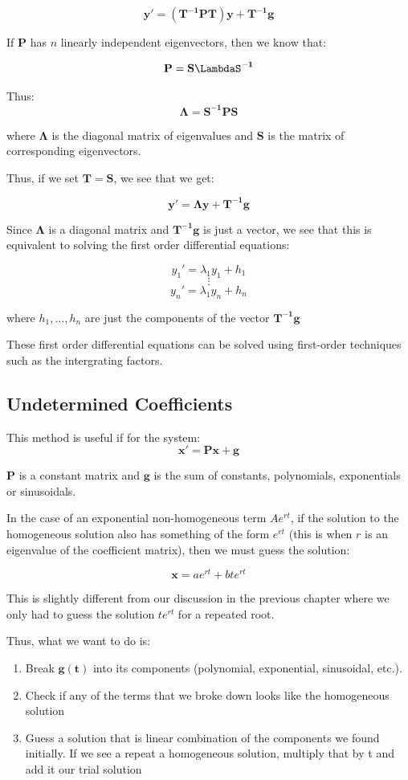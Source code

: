 \documentclass{report}
\begin{document}
$$\mathbf{y' = (T^{-1}PT)y + T^{-1}g}$$

If $\mathbf{P}$ has $n$ linearly independent eigenvectors, then we know that:

$$\mathbf{P=S\LambdaS^{-1}}$$

Thus:
$$\mathbf{\Lambda = S^{-1}PS}$$

where $\mathbf{\Lambda}$ is the diagonal matrix of eigenvalues and $\mathbf{S}$ is the matrix of corresponding eigenvectors.

Thus, if we set $\mathbf{T=S}$, we see that we get:

$$\mathbf{y' = \Lambda y + T^{-1}g}$$

Since $\mathbf{\Lambda}$ is a diagonal matrix and $\mathbf{T^{-1}g}$ is just a vector, we see that this is equivalent to solving the first order differential equations:

$$
y_1' = \lambda_1 y_1 + h_1
$$
$$
\vdots
$$
$$
y_n' = \lambda_1 y_n + h_n
$$

where $h_1, \dots, h_n$ are just the components of the vector $\mathbf{T^{-1}g}$

These first order differential equations can be solved using first-order techniques such as the intergrating factors.


\subsection{Undetermined Coefficients}

This method is useful if for the system:
$$\mathbf{x' = Px + g}$$

$\mathbf{P}$ is a constant matrix and $\mathbf{g}$ is the sum of constants, polynomials, exponentials or sinusoidals.

In the case of an exponential non-homogeneous term $Ae^{rt}$, if the solution to the homogeneous solution also has something of the form $e^{rt}$ (this is when $r$ is an eigenvalue of the coefficient matrix), then we must guess the solution:

$$\mathbf{x} = ae^{rt} + bte^{rt}$$

This is slightly different from our discussion in the previous chapter where we only had to guess the solution $te^{rt}$ for a repeated root.

Thus, what we want to do is:
\begin{enumerate}
    \item Break $\mathbf{g(t)}$ into its components (polynomial, exponential, sinusoidal, etc.).
    \item Check if any of the terms that we broke down looks like the homogeneous solution
    \item Guess a solution that is linear combination of the components we found initially. If we see a repeat a homogeneous solution, multiply that by t and add it our trial solution
\end{enumerate}
\end{document}
